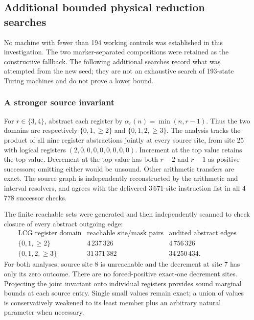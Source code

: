 \subsection{Additional bounded physical reduction searches}
\label{sec:ms-search}

No machine with fewer than 194 working controls was established in this
investigation.  The two marker-separated compositions were retained as the
constructive fallback.  The following additional searches record what was
attempted from the new seed; they are not an exhaustive search of 193-state
Turing machines and do not prove a lower bound.

\subsubsection{A stronger source invariant}
For $r\in\{3,4\}$, abstract each register by
$\alpha_r(n)=\min(n,r-1)$.  Thus the two domains are respectively
$\{0,1,{\geq}2\}$ and $\{0,1,2,{\geq}3\}$.
The analysis tracks the product of all nine register abstractions jointly
at every source site, from site 25 with logical registers
$(2,0,0,0,0,0,0,0,0)$.  Increment at the top value retains the top value.
Decrement at the top value has both $r-2$ and $r-1$ as positive successors;
omitting either would be unsound.  Other arithmetic transfers are exact.
The source graph is independently reconstructed by the arithmetic and
interval resolvers, and agrees with the delivered 3\,671-site instruction
list in all 4\,778 successor checks.

The finite reachable sets were generated and then independently scanned
to check closure of every abstract outgoing edge:
\[
\begin{array}{lrr}
\text{LCG register domain}&\text{reachable site/mask pairs}&
  \text{audited abstract edges}\\\hline
\{0,1,{\geq}2\}&4\,237\,326&4\,756\,326\\
\{0,1,2,{\geq}3\}&31\,371\,382&34\,250\,434.
\end{array}
\]
For both analyses, source site 8 is unreachable and the decrement at site 7
has only its zero outcome.  There are no forced-positive exact-one
decrement sites.  Projecting the joint invariant onto individual registers
provides sound marginal bounds at each source entry.  Single small values
remain exact; a union of values is conservatively weakened to its least
member plus an arbitrary natural parameter when necessary.


